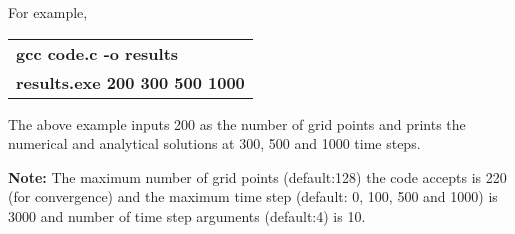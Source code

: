 \documentclass[12pt]{article}
\begin{document}
	For example,
	
	\begin{center}
		\begin{tabular}{l}
			\textbf{gcc code.c -o results} \\
			\textbf{results.exe 200 300 500 1000}
		\end{tabular}
	\end{center}

	The above example inputs 200 as the number of grid points and prints the numerical and analytical solutions at 300, 500 and 1000 time steps. 

	\textbf{Note:} The maximum number of grid points (default:128) the code accepts is 220 (for convergence) and the maximum time step (default: 0, 100, 500 and 1000) is 3000 and number of time step arguments (default:4) is 10.

	
	
	

	\appendix
		
	
	
	
\end{document}
